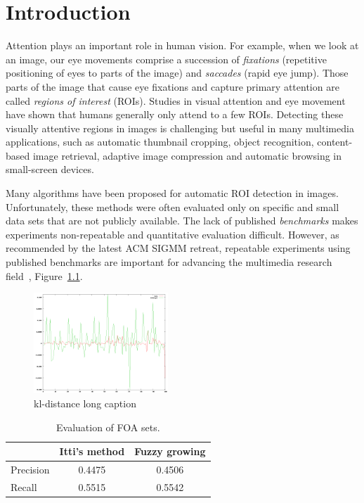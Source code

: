 \chapter{Introduction}
\label{c:intro}

Attention plays an important role in human vision. For example, when
we look at an image, our eye movements comprise a succession of {\em
fixations} (repetitive positioning of eyes to parts of the image)
and {\em saccades} (rapid eye jump). Those parts of the image that
cause eye fixations and capture primary attention are called {\em
regions of interest} (ROIs). Studies in visual attention and eye
movement have shown that humans generally only attend to a few ROIs.
Detecting these visually attentive regions in images is challenging
but useful in many multimedia applications, such as automatic
thumbnail cropping, object recognition, content-based image
retrieval, adaptive image compression and automatic browsing in
small-screen devices.

Many algorithms have been proposed for automatic ROI detection in
images. Unfortunately, these methods were often evaluated only on
specific and small data sets that are not publicly available. The
lack of published {\em benchmarks} makes experiments non-repeatable
and quantitative evaluation difficult. However, as recommended by
the latest ACM SIGMM retreat, repeatable experiments using published
benchmarks are important for advancing the multimedia research
field~\cite{Rowe:2005:ASR,intel_ocl_spm}, Figure~\ref{kl}.

\begin{figure}
\centering
\includegraphics[width=0.45\textwidth]{figures/kl}
\caption[KL short caption]{kl-distance long caption}
\label{kl}
\end{figure}

\begin{table}[t]
\begin{center}
\begin{tabular}{lcc}

\hline
                    &  {\small Itti's method}     & {\small Fuzzy growing}    \\
\hline
{\small Precision}           &  0.4475    & 0.4506 \\
{\small Recall}              &  0.5515    & 0.5542 \\
\hline

\end{tabular}
\caption[Evaluation of FOA sets]{\small Evaluation of FOA sets. } \label{t:FOA}
\end{center}
\end{table}
